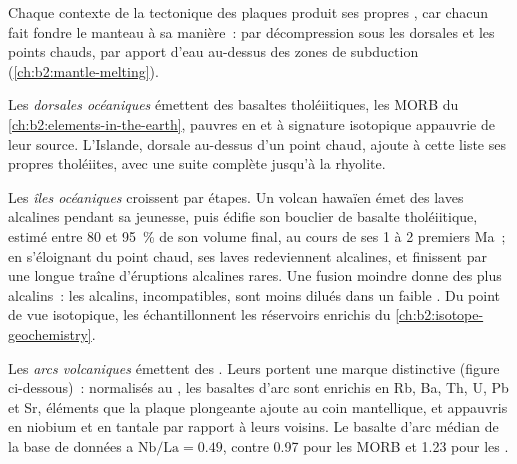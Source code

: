 Chaque contexte de la tectonique des plaques produit ses propres , car chacun fait fondre
le manteau à sa manière~: par décompression sous les dorsales et les points chauds, par apport d'eau
au-dessus des zones de subduction (\cref{ch:b2:mantle-melting}).

Les \emph{dorsales océaniques} émettent des basaltes tholéiitiques, les MORB du
\cref{ch:b2:elements-in-the-earth}, pauvres en  et à signature isotopique
appauvrie de leur source. L'Islande, dorsale au-dessus d'un point chaud, ajoute à cette liste ses
propres tholéiites, avec une suite complète jusqu'à la rhyolite.

Les \emph{îles océaniques} croissent par étapes. Un volcan hawaïen émet des laves alcalines pendant sa
jeunesse, puis édifie son bouclier de basalte tholéiitique, estimé entre 80 et
\qty{95}{\percent} de son volume final, au cours de ses 1 à 2 premiers Ma~; en s'éloignant du
point chaud, ses laves redeviennent alcalines, et finissent par une longue traîne d'éruptions
alcalines rares. Une fusion moindre donne des  plus alcalins~: les alcalins, incompatibles,
sont moins dilués dans un faible . Du point de vue isotopique, les  échantillonnent les réservoirs enrichis du \cref{ch:b2:isotope-geochemistry}.

Les \emph{arcs volcaniques} émettent des . Leurs  portent
une marque distinctive (figure ci-dessous)~: normalisés au , les basaltes d'arc
sont enrichis en Rb, Ba, Th, U, Pb et Sr, éléments que la plaque plongeante ajoute au coin
mantellique, et appauvris en niobium et en tantale par rapport à leurs voisins. Le basalte d'arc
médian de la base de données a $\mathrm{Nb}/\mathrm{La} = 0.49$, contre 0.97 pour les MORB
et 1.23 pour les .

